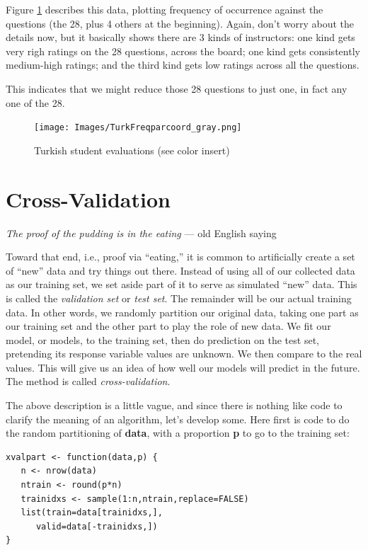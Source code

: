 Figure \ref{turkch1} describes this data, plotting frequency of
occurrence against the questions (the 28, plus 4 others at the
beginning).  Again, don't worry about the details now, but it basically
shows there are 3 kinds of instructors: one kind gets very righ ratings 
on the 28 questions, across the board; one kind gets consistently
medium-high ratings; and the third kind gets low ratings across all the
questions.

This indicates that we might reduce those 28 questions to just one, in
fact any one of the 28.

\begin{figure}[tb]
\vskip 0.5in
\centerline{
\texttt{[image: Images/TurkFreqparcoord\_gray.png]}
}
\caption{Turkish student evaluations (see color insert)}
\label{turkch1}
\end{figure}

\section{Cross-Validation}
\label{xval}

{\it The proof of the pudding is in the eating} --- old English saying
\vskip 0.2in

Toward that end, i.e., proof via ``eating,'' it is common to
artificially create a set of ``new'' data and try things out there.
Instead of using all of our collected data as our training set, we set
aside part of it to serve as simulated ``new'' data.  This is called the
{\it validation set} or {\it test set}. The remainder will be our actual
training data.  In other words, we randomly partition our original data,
taking one part as our training set and the other part to play the role
of new data.  We fit our model, or models, to the training set, then do
prediction on the test set, pretending its response variable values are
unknown.  We then compare to the real values.  This will give us an idea
of how well our models will predict in the future.  The method is called
{\it cross-validation}.

The above description is a little vague, and since there is nothing like
code to clarify the meaning of an algorithm, let's develop some.  Here
first is code to do the random partitioning of {\bf data}, with a
proportion {\bf p} to go to the training set:

\begin{lstlisting}
xvalpart <- function(data,p) {
   n <- nrow(data)
   ntrain <- round(p*n)
   trainidxs <- sample(1:n,ntrain,replace=FALSE)
   list(train=data[trainidxs,], 
      valid=data[-trainidxs,])
}
\end{lstlisting}

